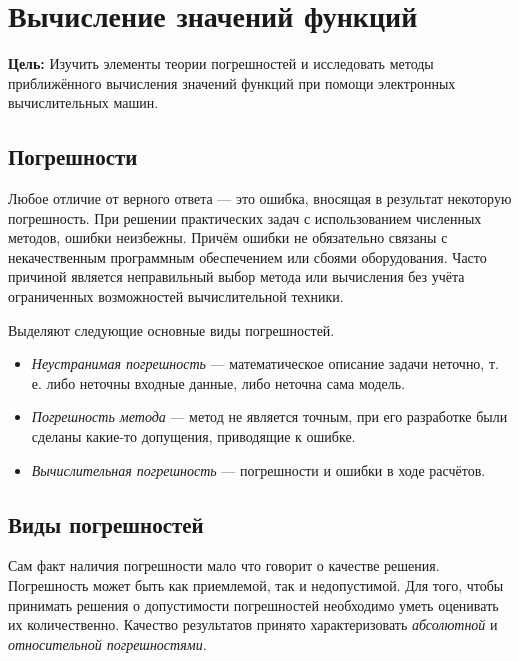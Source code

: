 \section{Вычисление значений функций}

\noindent \textbf{Цель:} Изучить элементы теории погрешностей и исследовать
методы приближённого вычисления значений функций при помощи электронных
вычислительных машин.

\medskip{}



\subsection{Погрешности}

Любое отличие от верного ответа — это ошибка, вносящая в результат
некоторую погрешность. При решении практических задач с использованием
численных методов, ошибки неизбежны. Причём ошибки не обязательно
связаны с некачественным программным обеспечением или сбоями оборудования.
Часто причиной является неправильный выбор метода или вычисления без
учёта ограниченных возможностей вычислительной техники.

Выделяют следующие основные виды погрешностей.
\begin{itemize}
\item \emph{Неустранимая погрешность} — математическое описание задачи неточно,
т. е. либо неточны входные данные, либо неточна сама модель.
\item \emph{Погрешность метода} — метод не является точным, при его разработке
были сделаны какие-то допущения, приводящие к ошибке.
\item \emph{Вычислительная погрешность} — погрешности и ошибки в ходе расчётов.
\end{itemize}

\subsection{Виды погрешностей}

Сам факт наличия погрешности мало что говорит о качестве решения.
Погрешность может быть как приемлемой, так и недопустимой. Для того,
чтобы принимать решения о допустимости погрешностей необходимо уметь
оценивать их количественно. Качество результатов принято характеризовать
\emph{абсолютной} и \emph{относительной погрешностями}.

